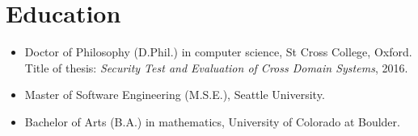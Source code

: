 \section*{Education}
\vspace{-2mm}

\begin{itemize}
    \item Doctor of Philosophy (D.Phil.) in computer science, St Cross College, Oxford.
        Title of thesis: \emph{Security Test and Evaluation of Cross Domain Systems},
        2016.\vspace{-1mm}
	\item Master of Software Engineering (M.S.E.), Seattle University.\vspace{-1mm}
	\item Bachelor of Arts (B.A.) in mathematics, University of Colorado at Boulder.
\end{itemize}

